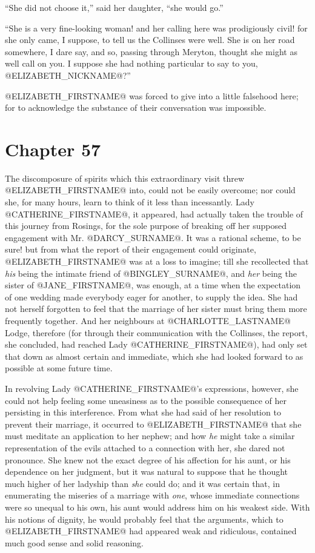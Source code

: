 ``She did not choose it,'' said her daughter, ``she would go.''

``She is a very fine-looking woman! and her calling here was prodigiously
civil! for she only came, I suppose, to tell us the Collinses were
well. She is on her road somewhere, I dare say, and so, passing through
Meryton, thought she might as well call on you. I suppose she had
nothing particular to say to you, @ELIZABETH_NICKNAME@?''

@ELIZABETH_FIRSTNAME@ was forced to give into a little falsehood here; for to
acknowledge the substance of their conversation was impossible.



\chapter*{Chapter 57}


The discomposure of spirits which this extraordinary visit threw
@ELIZABETH_FIRSTNAME@ into, could not be easily overcome; nor could she, for many
hours, learn to think of it less than incessantly. Lady @CATHERINE_FIRSTNAME@, it
appeared, had actually taken the trouble of this journey from Rosings,
for the sole purpose of breaking off her supposed engagement with Mr.
@DARCY_SURNAME@. It was a rational scheme, to be sure! but from what the report
of their engagement could originate, @ELIZABETH_FIRSTNAME@ was at a loss to imagine;
till she recollected that \textit{his} being the intimate friend of @BINGLEY_SURNAME@,
and \textit{her} being the sister of @JANE_FIRSTNAME@, was enough, at a time when the
expectation of one wedding made everybody eager for another, to supply
the idea. She had not herself forgotten to feel that the marriage of her
sister must bring them more frequently together. And her neighbours
at @CHARLOTTE_LASTNAME@ Lodge, therefore (for through their communication with the
Collinses, the report, she concluded, had reached Lady @CATHERINE_FIRSTNAME@), had
only set that down as almost certain and immediate, which she had looked
forward to as possible at some future time.

In revolving Lady @CATHERINE_FIRSTNAME@'s expressions, however, she could not help
feeling some uneasiness as to the possible consequence of her persisting
in this interference. From what she had said of her resolution to
prevent their marriage, it occurred to @ELIZABETH_FIRSTNAME@ that she must meditate
an application to her nephew; and how \textit{he} might take a similar
representation of the evils attached to a connection with her, she dared
not pronounce. She knew not the exact degree of his affection for his
aunt, or his dependence on her judgment, but it was natural to suppose
that he thought much higher of her ladyship than \textit{she} could do; and it
was certain that, in enumerating the miseries of a marriage with \textit{one},
whose immediate connections were so unequal to his own, his aunt would
address him on his weakest side. With his notions of dignity, he would
probably feel that the arguments, which to @ELIZABETH_FIRSTNAME@ had appeared weak
and ridiculous, contained much good sense and solid reasoning.

